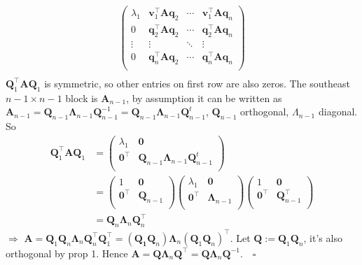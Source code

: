 \documentclass[a4paper, 11pt]{article}
\begin{document}
\begin{itemize}
\begin{equation*}
\begin{split}
\begin{pmatrix}
				\lambda_1 & \bm{v}_1^{\top} \bm{Aq}_2 & \cdots & \bm{v}_1^{\top} \bm{Aq}_n \\
				0 & \bm{q}_2^{\top} \bm{Aq}_2 & \cdots & \bm{q}_2^{\top} \bm{Aq}_n \\
				\vdots & \vdots & \ddots & \vdots \\
				0 & \bm{q}_n^{\top} \bm{Aq}_2 & \cdots & \bm{q}_n^{\top} \bm{Aq}_n\\
			\end{pmatrix}\\
		\end{split}
	\end{equation*}
	$\bm{Q}_1^{\top} \bm{AQ}_1$ is symmetric, so other entries on first row are also zeros. The southeast $n-1\times n-1$ block is $\bm{A}_{n-1}$, by assumption it can be written as $\bm{A}_{n-1}=\bm{Q}_{n-1} \bm{\Lambda}_{n-1} \bm{Q}_{n-1}^{-1}=\bm{Q}_{n-1} \bm{\Lambda}_{n-1} \bm{Q}_{n-1}^{t}$, $\bm{Q}_{n-1}$ orthogonal, $\Lambda_{n-1}$ diagonal. So
	\begin{equation*}
		\begin{split}
			\bm{Q}_1^{\top} \bm{AQ}_1 &= 
			\begin{pmatrix}
				\lambda_1 & \bm{0}\\
				\bm{0}^{\top} & \bm{Q}_{n-1} \bm{\Lambda}_{n-1} \bm{Q}_{n-1}^{t}\\
			\end{pmatrix}\\
			&=
			\begin{pmatrix}
				1 & \bm{0} \\
				\bm{0}^{\top} & \bm{Q}_{n-1}\\
			\end{pmatrix}
			\begin{pmatrix}
				\lambda_1 & \bm{0} \\
				\bm{0}^{\top} & \bm{\Lambda}_{n-1}\\
			\end{pmatrix}
			\begin{pmatrix}
				1 & \bm{0} \\
				\bm{0}^{\top} & \bm{Q}_{n-1}^{\top}\\
			\end{pmatrix}\\
			&= \bm{Q}_n \bm{\Lambda}_n\bm{Q}_n^{\top}
		\end{split}
	\end{equation*}
	$\Rightarrow$ $\bm{A}=\bm{Q}_1 \bm{Q}_n \bm{\Lambda}_n\bm{Q}_n^{\top} \bm{Q}_1^{\top} = (\bm{Q_1}\bm{Q}_n) \bm{\Lambda}_n (\bm{Q}_1 \bm{Q}_n)^{\top}$. Let $\bm{Q}:=\bm{Q}_1 \bm{Q}_n$, it's also orthogonal by prop 1. Hence $\bm{A}=\bm{Q} \bm{\Lambda}_n \bm{Q}^{\top}=\bm{Q} \bm{\Lambda}_n \bm{Q}^{-1} $.~~$\square$
\end{itemize}
\end{document}
